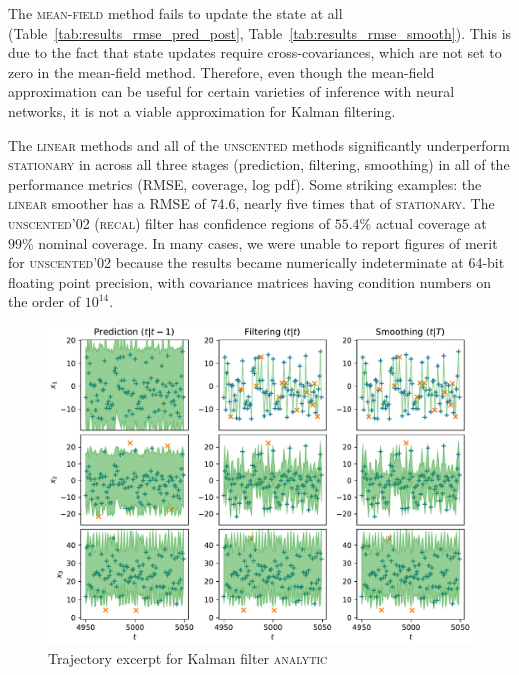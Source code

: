 \documentclass{article} %
\begin{document}
The \textsc{mean-field} method fails to update the state at all (Table~\ref{tab:results_rmse_pred_post}, Table~\ref{tab:results_rmse_smooth}).
This is due to the fact that state updates require cross-covariances, which are not set to zero in the mean-field method.
Therefore, even though the mean-field approximation can be useful for certain varieties of inference with neural networks, it is not a viable approximation for Kalman filtering.

The \textsc{linear} methods and all of the \textsc{unscented} methods significantly underperform \textsc{stationary} in across all three stages (prediction, filtering, smoothing) in all of the performance metrics (RMSE, coverage, log pdf).
Some striking examples: the \textsc{linear} smoother has a RMSE of 74.6, nearly five times that of \textsc{stationary}.
The \textsc{unscented'02 (recal)} filter has confidence regions of \(55.4\%\) actual coverage at \(99\%\) nominal coverage.
In many cases, we were unable to report figures of merit for \textsc{unscented'02} because the results became numerically indeterminate at 64-bit floating point precision, with covariance matrices having condition numbers on the order of \(10^{14}\).

\begin{figure}
\begin{center}
\includegraphics[width=\linewidth]{generated/trajectory/Method.ANALYTIC-Recalibrate.NO.pdf}
\end{center}
\caption{\label{fig:analytic_trajectory}Trajectory excerpt for Kalman filter \textsc{{\textsc{analytic}}}}
\end{figure}
\end{document}
